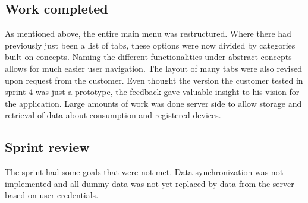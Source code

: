\subsection{Work completed}
As mentioned above, the entire main menu was restructured. Where there had previously just been a list of tabs, these options were now divided by categories built on concepts. Naming the different functionalities under abstract concepts allows for much easier user navigation. The layout of many tabs were also revised upon request from the customer. Even thought the version the customer tested in sprint 4 was just a prototype, the feedback gave valuable insight to his vision for the application. 	Large amounts of work was done server side to allow storage and retrieval of data about consumption and registered devices. 

\subsection{Sprint review}
The sprint had some goals that were not met. Data synchronization was not implemented and all dummy data was not yet replaced by data from the server based on user credentials.